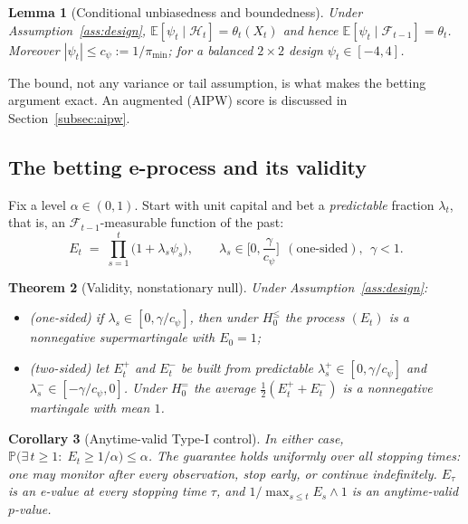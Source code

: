 \documentclass[pdflatex,sn-mathphys-ay]{sn-jnl}%
\theoremstyle{thmstyleone}%
\newtheorem{theorem}{Theorem}%
\newtheorem{lemma}[theorem]{Lemma}%
\newtheorem{corollary}[theorem]{Corollary}%
\theoremstyle{thmstyletwo}%
\theoremstyle{thmstylethree}%
\newcommand{\E}{\mathbb{E}}
\newcommand{\Prob}{\mathbb{P}}
\newcommand{\F}{\mathcal{F}}
\begin{document}
\begin{lemma}[Conditional unbiasedness and boundedness]\label{lem:unbiased}
Under Assumption~\ref{ass:design}, $\E[\psi_t\mid\mathcal H_t]=\theta_t(X_t)$ and hence
$\E[\psi_t\mid\F_{t-1}]=\theta_t$. Moreover $|\psi_t|\le c_\psi:=1/\pi_{\min}$; for a
balanced $2\times2$ design $\psi_t\in[-4,4]$.
\end{lemma}

The bound, not any variance or tail assumption, is what makes the betting argument
exact. An augmented (AIPW) score is discussed in Section~\ref{subsec:aipw}.

\subsection{The betting e-process and its validity}\label{subsec:eprocess}

Fix a level $\alpha\in(0,1)$. Start with unit capital and bet a \emph{predictable} fraction
$\lambda_t$, that is, an $\F_{t-1}$-measurable function of the past:
\begin{equation}\label{eq:capital}
E_t\;=\;\prod_{s=1}^{t}\bigl(1+\lambda_s\psi_s\bigr),\qquad
\lambda_s\in\Big[0,\frac{\gamma}{c_\psi}\Big]\ \ (\text{one-sided}),\ \ \gamma<1 .
\end{equation}

\begin{theorem}[Validity, nonstationary null]\label{thm:validity}
Under Assumption~\ref{ass:design}:
\begin{itemize}
\item[(a)] (one-sided) if $\lambda_s\in[0,\gamma/c_\psi]$, then under $H_0^{\le}$ the process
$(E_t)$ is a nonnegative supermartingale with $E_0=1$;
\item[(b)] (two-sided) let $E_t^{+}$ and $E_t^{-}$ be built from predictable
$\lambda_s^{+}\in[0,\gamma/c_\psi]$ and $\lambda_s^{-}\in[-\gamma/c_\psi,0]$. Under $H_0^{=}$
the average $\tfrac12(E_t^{+}+E_t^{-})$ is a nonnegative martingale with mean $1$.
\end{itemize}
\end{theorem}

\begin{corollary}[Anytime-valid Type-I control]\label{cor:anytime}
In either case, $\Prob\bigl(\exists\,t\ge1:\;E_t\ge 1/\alpha\bigr)\le\alpha$.
The guarantee holds uniformly over all stopping times: one may monitor after every
observation, stop early, or continue indefinitely. $E_\tau$ is an e-value at every stopping
time $\tau$, and $1/\max_{s\le t}E_s\wedge 1$ is an anytime-valid $p$-value.
\end{corollary}
\end{document}
